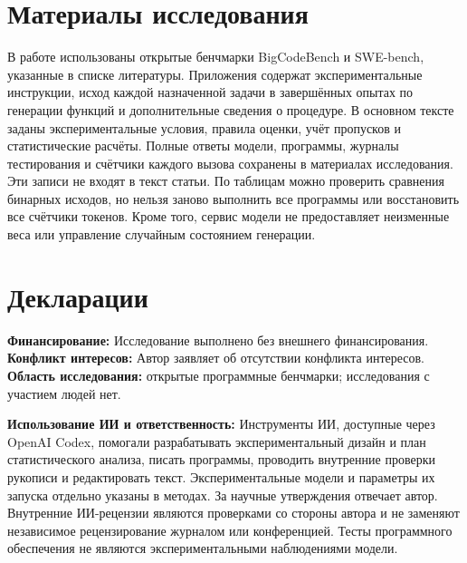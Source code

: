 \section*{Материалы исследования}
В работе использованы открытые бенчмарки BigCodeBench и SWE-bench, указанные в списке литературы. Приложения содержат экспериментальные инструкции, исход каждой назначенной задачи в завершённых опытах по генерации функций и дополнительные сведения о процедуре. В основном тексте заданы экспериментальные условия, правила оценки, учёт пропусков и статистические расчёты. Полные ответы модели, программы, журналы тестирования и счётчики каждого вызова сохранены в материалах исследования. Эти записи не входят в текст статьи. По таблицам можно проверить сравнения бинарных исходов, но нельзя заново выполнить все программы или восстановить все счётчики токенов. Кроме того, сервис модели не предоставляет неизменные веса или управление случайным состоянием генерации.

\section*{Декларации}
\textbf{Финансирование:} Исследование выполнено без внешнего финансирования. \textbf{Конфликт интересов:} Автор заявляет об отсутствии конфликта интересов. \textbf{Область исследования:} открытые программные бенчмарки; исследования с участием людей нет.

\textbf{Использование ИИ и ответственность:} Инструменты ИИ, доступные через OpenAI Codex, помогали разрабатывать экспериментальный дизайн и план статистического анализа, писать программы, проводить внутренние проверки рукописи и редактировать текст. Экспериментальные модели и параметры их запуска отдельно указаны в методах. За научные утверждения отвечает автор. Внутренние ИИ-рецензии являются проверками со стороны автора и не заменяют независимое рецензирование журналом или конференцией. Тесты программного обеспечения не являются экспериментальными наблюдениями модели.

\clearpage\appendix
